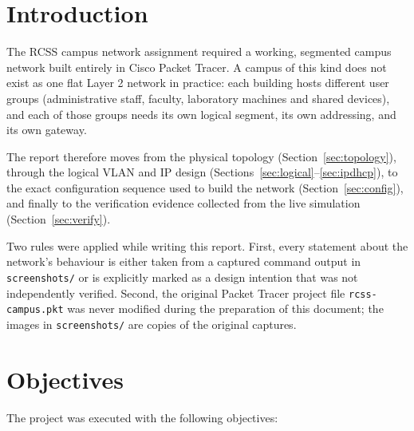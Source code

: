 \documentclass[11pt,a4paper]{article}
\begin{document}
\section{Introduction}

\noindent
The RCSS campus network assignment required a working, segmented campus network built
entirely in Cisco Packet Tracer. A campus of this kind does not exist as one flat
Layer 2 network in practice: each building hosts different user groups (administrative
staff, faculty, laboratory machines and shared devices), and each of those groups needs
its own logical segment, its own addressing, and its own gateway.

The report therefore moves from the physical topology (Section~\ref{sec:topology}),
through the logical VLAN and IP design (Sections~\ref{sec:logical}--\ref{sec:ipdhcp}),
to the exact configuration sequence used to build the network (Section~\ref{sec:config}),
and finally to the verification evidence collected from the live simulation
(Section~\ref{sec:verify}).

Two rules were applied while writing this report. First, every statement about the
network's behaviour is either taken from a captured command output in
\texttt{screenshots/} or is explicitly marked as a design intention that was not
independently verified. Second, the original Packet Tracer project file
\texttt{rcss-campus.pkt} was never modified during the preparation of this document;
the images in \texttt{screenshots/} are copies of the original captures.

\section{Objectives}

The project was executed with the following objectives:
\end{document}
